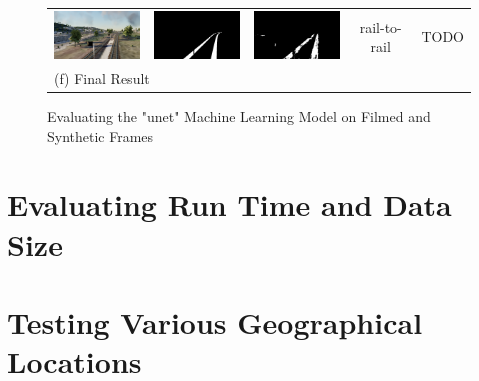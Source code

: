 \begin{figure}
\begin{tabular}{ccccc}
  \includegraphics[width=30mm]{src/img/results-ml-0/par5/frame.png} & 
  \includegraphics[width=30mm]{src/img/results-ml-0/par5/seg.png} & 
  \includegraphics[width=30mm]{src/img/results-ml-0/par5/det.jpeg} &
  rail-to-rail & TODO \\
  \multicolumn{5}{l}{  (f) Final Result  } \\
  
\end{tabular}
\caption{Evaluating the "unet" Machine Learning Model on Filmed and Synthetic Frames}
\label{fig:ml-pics}

\end{figure}

\section{Evaluating Run Time and Data Size}
\label{sec:evaluate-runtime}


\section{Testing Various Geographical Locations}
\label{sec:test-locations}